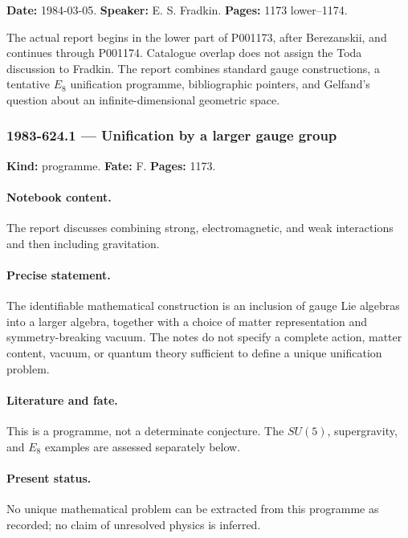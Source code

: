 \label{talk:624}

\noindent\textbf{Date:} 1984-03-05. \textbf{Speaker:} E. S. Fradkin. \textbf{Pages:} 1173 lower--1174.\par

The actual report begins in the lower part of P001173, after Berezanskii, and continues through P001174. Catalogue overlap does not assign the Toda discussion to Fradkin. The report combines standard gauge constructions, a tentative \(E_8\) unification programme, bibliographic pointers, and Gelfand’s question about an infinite-dimensional geometric space.

\subsubsection{1983-624.1 --- Unification by a larger gauge group}

\label{item:1983-624.1}

\noindent\textbf{Kind:} programme. \textbf{Fate:} F. \textbf{Pages:} 1173.\par

\paragraph{Notebook content.} The report discusses combining strong, electromagnetic, and weak interactions and then including gravitation.

\paragraph{Precise statement.} The identifiable mathematical construction is an inclusion of gauge Lie algebras into a larger algebra, together with a choice of matter representation and symmetry-breaking vacuum. The notes do not specify a complete action, matter content, vacuum, or quantum theory sufficient to define a unique unification problem.

\paragraph{Literature and fate.} This is a programme, not a determinate conjecture. The \(SU(5)\), supergravity, and \(E_8\) examples are assessed separately below.

\paragraph{Present status.} No unique mathematical problem can be extracted from this programme as recorded; no claim of unresolved physics is inferred.

